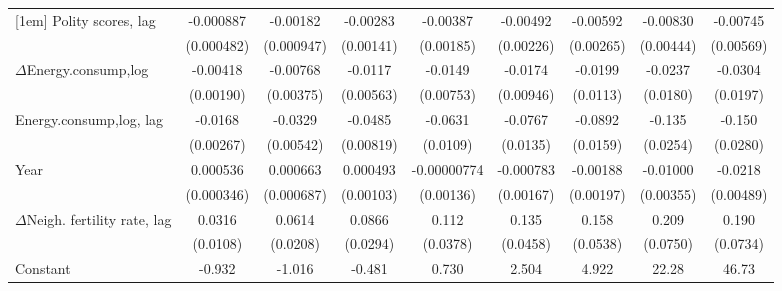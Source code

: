 \begin{table}[htbp]
\begin{tabular}{l*{8}{c}}
[1em]
Polity scores, lag          &   -0.000887\sym{*}  &    -0.00182\sym{*}  &    -0.00283\sym{**} &    -0.00387\sym{**} &    -0.00492\sym{**} &    -0.00592\sym{**} &    -0.00830\sym{*}  &    -0.00745         \\
                    &  (0.000482)         &  (0.000947)         &   (0.00141)         &   (0.00185)         &   (0.00226)         &   (0.00265)         &   (0.00444)         &   (0.00569)         \\
[1em]
$\Delta$Energy.consump,log             &    -0.00418\sym{**} &    -0.00768\sym{**} &     -0.0117\sym{**} &     -0.0149\sym{*}  &     -0.0174\sym{*}  &     -0.0199\sym{*}  &     -0.0237         &     -0.0304         \\
                    &   (0.00190)         &   (0.00375)         &   (0.00563)         &   (0.00753)         &   (0.00946)         &    (0.0113)         &    (0.0180)         &    (0.0197)         \\
[1em]
Energy.consump,log, lag             &     -0.0168\sym{***}&     -0.0329\sym{***}&     -0.0485\sym{***}&     -0.0631\sym{***}&     -0.0767\sym{***}&     -0.0892\sym{***}&      -0.135\sym{***}&      -0.150\sym{***}\\
                    &   (0.00267)         &   (0.00542)         &   (0.00819)         &    (0.0109)         &    (0.0135)         &    (0.0159)         &    (0.0254)         &    (0.0280)         \\
[1em]
Year                &    0.000536         &    0.000663         &    0.000493         & -0.00000774         &   -0.000783         &    -0.00188         &    -0.01000\sym{***}&     -0.0218\sym{***}\\
                    &  (0.000346)         &  (0.000687)         &   (0.00103)         &   (0.00136)         &   (0.00167)         &   (0.00197)         &   (0.00355)         &   (0.00489)         \\
[1em]
$\Delta$Neigh. fertility rate, lag&      0.0316\sym{***}&      0.0614\sym{***}&      0.0866\sym{***}&       0.112\sym{***}&       0.135\sym{***}&       0.158\sym{***}&       0.209\sym{***}&       0.190\sym{**} \\
                    &    (0.0108)         &    (0.0208)         &    (0.0294)         &    (0.0378)         &    (0.0458)         &    (0.0538)         &    (0.0750)         &    (0.0734)         \\
[1em]
Constant            &      -0.932         &      -1.016         &      -0.481         &       0.730         &       2.504         &       4.922         &       22.28\sym{***}&       46.73\sym{***}\\

\end{tabular}
\end{table}
